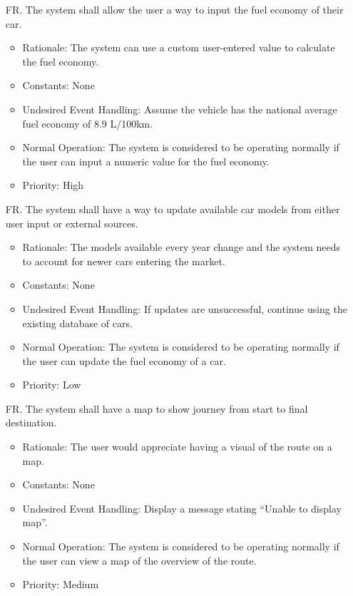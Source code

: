 \documentclass[12pt]{article}
\newcounter{reqnum} %
\begin{document}
\begin{itemize}
\item[FR\refstepcounter{reqnum}\thereqnum. ] The system shall allow the user a way to input the fuel economy of their car.
\begin{itemize}
    \item Rationale: The system can use a custom user-entered value to calculate the fuel economy.
    \item Constants: None
    \item Undesired Event Handling: Assume the vehicle has the national average fuel economy of 8.9 L/100km.
    \item Normal Operation: The system is considered to be operating normally if the user can input a numeric value for the fuel economy.
	\item Priority: High
\end{itemize}

\item[FR\refstepcounter{reqnum}\thereqnum. ] The system shall have a way to update available car models from either user input or external sources.
\begin{itemize}
    \item Rationale: The models available every year change and the system needs to account for newer cars entering the market.
    \item Constants: None
    \item Undesired Event Handling: If updates are unsuccessful, continue using the existing database of cars.
    \item Normal Operation: The system is considered to be operating normally if the user can update the fuel economy of a car.
	\item Priority: Low
\end{itemize}

\item[FR\refstepcounter{reqnum}\thereqnum. ] The system shall have a map to show journey from start to final destination.
\begin{itemize}
    \item Rationale: The user would appreciate having a visual of the route on a map.
    \item Constants: None
    \item Undesired Event Handling: Display a message stating “Unable to display map”.
    \item Normal Operation: The system is considered to be operating normally if the user can view a map of the overview of the route.
	\item Priority: Medium
\end{itemize}


\end{itemize}
\end{document}
